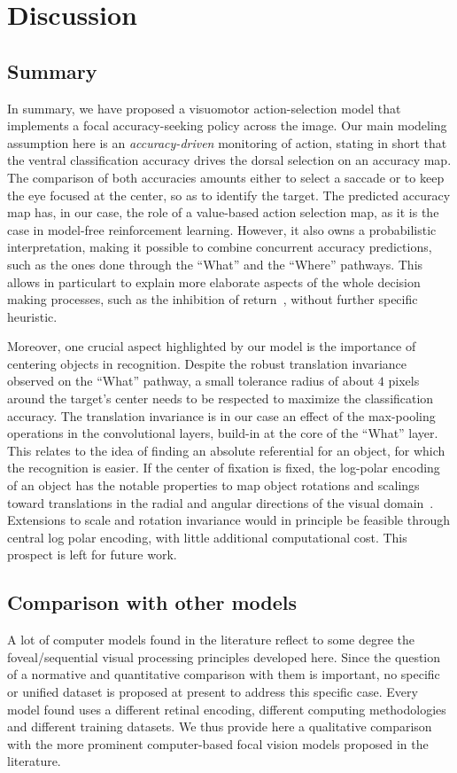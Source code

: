\section{Discussion} \label{sec:discussion}
\subsection{Summary}
%
In summary, we have proposed a visuomotor action-selection model that implements a focal accuracy-seeking policy across the image. Our main modeling assumption here is an \emph{accuracy-driven} monitoring of action, stating in short that the ventral classification accuracy drives the dorsal selection on an accuracy map. The comparison of both accuracies amounts either to select a saccade or to keep the eye focused at the center, so as to identify the target. The predicted accuracy map has, in our case, the role of a value-based action selection map, as it is the case in model-free reinforcement learning. However, it also owns a probabilistic interpretation, making it possible to combine concurrent accuracy predictions, such as the ones done through the ``What'' and the ``Where'' pathways. This allows in particulart to explain more elaborate aspects of the whole decision making processes, such as the inhibition of return~\cite{Itti01}, without further specific heuristic.

Moreover, one crucial aspect highlighted by our model is the importance of centering objects in recognition. Despite the robust translation invariance observed on the ``What'' pathway, a small tolerance radius of about $4$ pixels around the target's center needs to be respected to maximize the classification accuracy. The translation invariance is in our case an effect of the max-pooling operations in the convolutional layers, build-in at the core of the ``What'' layer. This relates to the idea of finding an absolute referential for an object, for which the recognition is easier. If the center of fixation is fixed, the log-polar encoding of an object has the notable properties to map object rotations and scalings toward translations in the radial and angular directions of the visual domain~\cite{Traver10}. Extensions to scale and rotation invariance would in principle be feasible through central log polar encoding, with little additional computational cost. This prospect is left for future work.
%
\subsection{Comparison with other models}
A lot of computer models found in the literature reflect to some degree the foveal/sequential visual processing principles developed here. Since the question of a normative and quantitative comparison with them is important, no specific or unified dataset is proposed at present to address this specific case. Every model found uses a different retinal encoding, different computing methodologies and different training datasets. We thus provide here a qualitative comparison with the more prominent computer-based focal vision models proposed in the literature.

